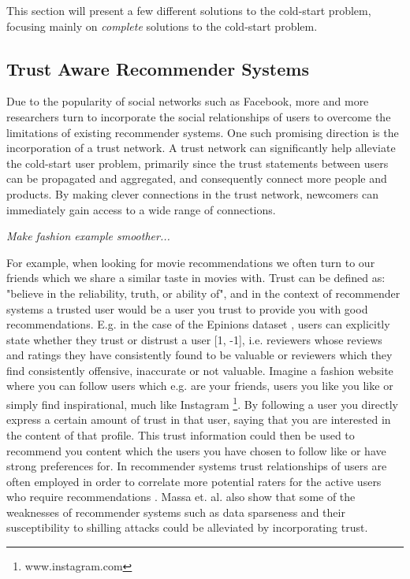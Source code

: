 
This section will present a few different solutions to the cold-start problem, focusing mainly on \emph{complete} solutions to the cold-start problem.

\subsection{Trust Aware Recommender Systems}

Due to the popularity of social networks such as Facebook, more and more
researchers turn to incorporate the social relationships of users to overcome
the limitations of existing recommender systems. One such promising direction is
the incorporation of a trust network. A trust network can significantly help alleviate
the cold-start user problem, primarily since the trust statements between users can be propagated
and aggregated, and consequently connect more people and products. By making clever connections in
the trust network, newcomers can immediately gain access to a wide range of connections.


\emph{Make fashion example smoother...}

For example, when looking for movie recommendations we often turn to our friends which we share a similar
taste in movies with. Trust can be defined as: "believe in the reliability, truth, or ability of", and in
the context of recommender systems a trusted user would be a user you trust to provide you with good recommendations.
E.g. in the case of the Epinions dataset \cite{Epinions}, users can explicitly state whether they trust or distrust a
user [1, -1], i.e. reviewers whose reviews and ratings they have consistently found to be valuable or reviewers which
they find consistently offensive, inaccurate or not valuable.
Imagine a fashion website where you can follow users which e.g. are your friends, users you like you like or simply
find inspirational, much like Instagram \footnote{www.instagram.com}. By following a user you directly express a 
certain amount of trust in that user, saying that you are interested in the content of that profile. This
trust information could then be used to recommend you content which the users you have chosen to follow like
or have strong preferences for. In recommender systems trust relationships of users are often employed in order to correlate
more potential raters for the active users who require recommendations \cite{Massa2004, Massa2007}. Massa et. al. \cite{Massa2004}
also show that some of the weaknesses of recommender systems such as data sparseness and their susceptibility to shilling attacks
could be alleviated by incorporating trust.

